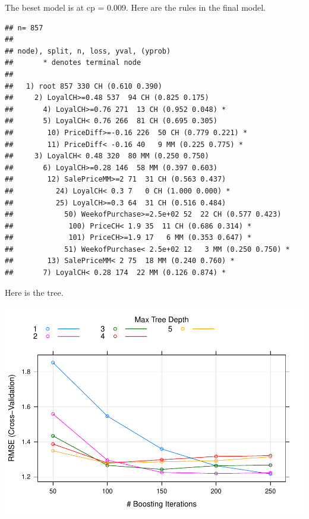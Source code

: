 \documentclass[
]{book}
\newenvironment{Shaded}{\begin{snugshade}}{\end{snugshade}}
\newcommand{\DecValTok}[1]{\textcolor[rgb]{0.00,0.00,0.81}{#1}}
\newcommand{\KeywordTok}[1]{\textcolor[rgb]{0.13,0.29,0.53}{\textbf{#1}}}
\newcommand{\NormalTok}[1]{#1}
\newcommand{\OperatorTok}[1]{\textcolor[rgb]{0.81,0.36,0.00}{\textbf{#1}}}
\begin{document}
The beset model is at cp = 0.009. Here are the rules in the final model.

\begin{Shaded}
\end{Shaded}

\begin{verbatim}
## n= 857 
## 
## node), split, n, loss, yval, (yprob)
##       * denotes terminal node
## 
##   1) root 857 330 CH (0.610 0.390)  
##     2) LoyalCH>=0.48 537  94 CH (0.825 0.175)  
##       4) LoyalCH>=0.76 271  13 CH (0.952 0.048) *
##       5) LoyalCH< 0.76 266  81 CH (0.695 0.305)  
##        10) PriceDiff>=-0.16 226  50 CH (0.779 0.221) *
##        11) PriceDiff< -0.16 40   9 MM (0.225 0.775) *
##     3) LoyalCH< 0.48 320  80 MM (0.250 0.750)  
##       6) LoyalCH>=0.28 146  58 MM (0.397 0.603)  
##        12) SalePriceMM>=2 71  31 CH (0.563 0.437)  
##          24) LoyalCH< 0.3 7   0 CH (1.000 0.000) *
##          25) LoyalCH>=0.3 64  31 CH (0.516 0.484)  
##            50) WeekofPurchase>=2.5e+02 52  22 CH (0.577 0.423)  
##             100) PriceCH< 1.9 35  11 CH (0.686 0.314) *
##             101) PriceCH>=1.9 17   6 MM (0.353 0.647) *
##            51) WeekofPurchase< 2.5e+02 12   3 MM (0.250 0.750) *
##        13) SalePriceMM< 2 75  18 MM (0.240 0.760) *
##       7) LoyalCH< 0.28 174  22 MM (0.126 0.874) *
\end{verbatim}

Here is the tree.

\begin{Shaded}
\end{Shaded}

\includegraphics{data-sci_files/figure-latex/unnamed-chunk-85-1.pdf}
\end{document}
